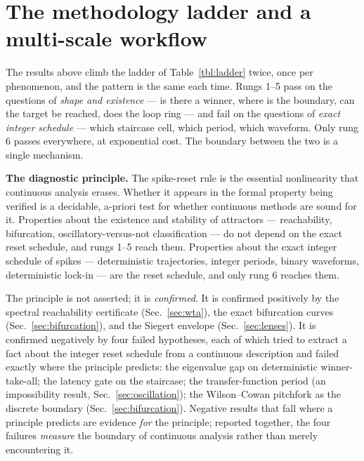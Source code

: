 \documentclass[conference]{IEEEtran}
\begin{document}
\section{The methodology ladder and a multi-scale workflow}\label{sec:ladder}

The results above climb the ladder of Table~\ref{tbl:ladder} twice, once per
phenomenon, and the pattern is the same each time. Rungs 1--5 pass on the
questions of \emph{shape and existence} --- is there a winner, where is the
boundary, can the target be reached, does the loop ring --- and fail on the
questions of \emph{exact integer schedule} --- which staircase cell, which
period, which waveform. Only rung 6 passes everywhere, at exponential cost. The
boundary between the two is a single mechanism.

\par\smallskip\noindent\textbf{The diagnostic principle.} The spike-reset rule
is the essential nonlinearity that continuous analysis erases. Whether it
appears in the formal property being verified is a decidable, a-priori test for
whether continuous methods are sound for it. Properties about the existence and
stability of attractors --- reachability, bifurcation, oscillatory-versus-not
classification --- do not depend on the exact reset schedule, and rungs 1--5
reach them. Properties about the exact integer schedule of spikes ---
deterministic trajectories, integer periods, binary waveforms, deterministic
lock-in --- are the reset schedule, and only rung 6 reaches them.
\par\smallskip

The principle is not asserted; it is \emph{confirmed}. It is confirmed
positively by the spectral reachability certificate (Sec.~\ref{sec:wta}), the
exact bifurcation curves (Sec.~\ref{sec:bifurcation}), and the Siegert envelope
(Sec.~\ref{sec:lenses}). It is confirmed negatively by four failed hypotheses,
each of which tried to extract a fact about the integer reset schedule from a
continuous description and failed exactly where the principle predicts: the
eigenvalue gap on deterministic winner-take-all; the latency gate on the
staircase; the transfer-function period (an impossibility result,
Sec.~\ref{sec:oscillation}); the Wilson--Cowan pitchfork as the discrete
boundary (Sec.~\ref{sec:bifurcation}). Negative results that fall where a
principle predicts are evidence \emph{for} the principle; reported together, the
four failures \emph{measure} the boundary of continuous analysis rather than
merely encountering it.
\end{document}
